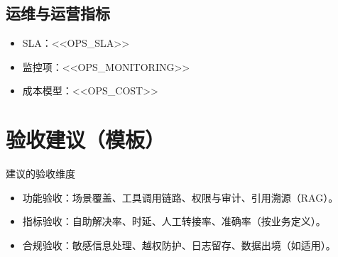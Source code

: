 \documentclass[UTF8,a4paper,11pt,fontset=fandol]{ctexart}
\begin{document}
\subsection{运维与运营指标}
\begin{itemize}[leftmargin=2.2em]
  \item SLA：<<OPS_SLA>>
  \item 监控项：<<OPS_MONITORING>>
  \item 成本模型：<<OPS_COST>>
\end{itemize}

\section{验收建议（模板）}
\begin{infobox}{建议的验收维度}
\begin{itemize}[leftmargin=2.2em]
  \item 功能验收：场景覆盖、工具调用链路、权限与审计、引用溯源（RAG）。
  \item 指标验收：自助解决率、时延、人工转接率、准确率（按业务定义）。
  \item 合规验收：敏感信息处理、越权防护、日志留存、数据出境（如适用）。
\end{itemize}
\end{infobox}
\end{document}
